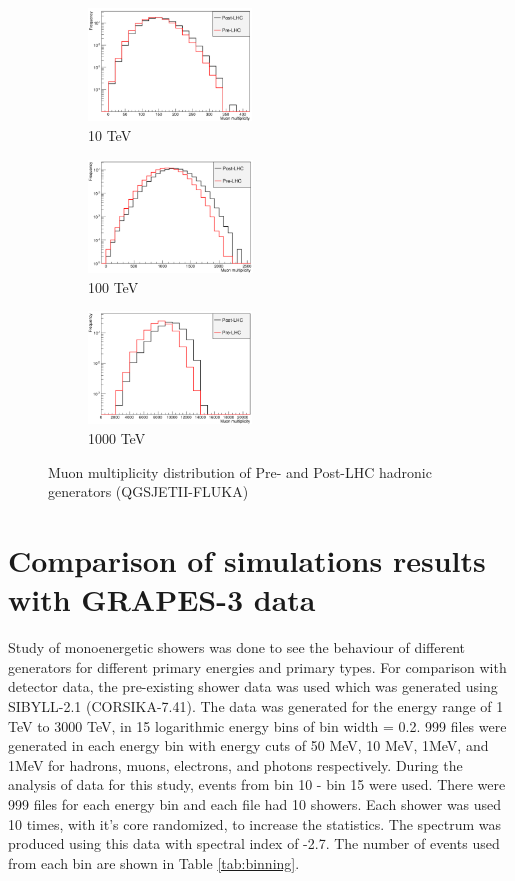 \documentclass[12pt]{article}
\begin{document}
\begin{figure}
\begin{subfigure}{0.32\textwidth}
\includegraphics[width=0.9\linewidth, height=3cm]{qgsii-lhc-mm10} 
\caption{10 TeV}
\label{fig:qgsii-lhc-mm10}
\end{subfigure}
\begin{subfigure}{0.32\textwidth}
\includegraphics[width=0.9\linewidth, height=3cm]{qgsii-lhc-mm100} 
\caption{100 TeV}
\label{fig:qgsii-lhc-mm100}
\end{subfigure}
\begin{subfigure}{0.32\textwidth}
\includegraphics[width=0.9\linewidth, height = 3cm]{qgsii-lhc-mm1000} 
\caption{1000 TeV}
\label{fig:qgsii-lhc-mm1000}
\end{subfigure}
\caption{Muon multiplicity distribution of Pre- and Post-LHC hadronic generators (QGSJETII-FLUKA)}
\label{fig:lhc_multiplicity_qgsii}
\end{figure}

\section{Comparison of simulations results with GRAPES-3 data}
Study of monoenergetic showers was done to see the behaviour of different generators for different primary energies and primary types. For comparison with detector data, the pre-existing shower data was used which was generated using SIBYLL-2.1 (CORSIKA-7.41). The data was generated for the energy range of 1 TeV to 3000 TeV, in 15 logarithmic energy bins of bin width = 0.2. 999 files were generated in each energy bin with energy cuts of 50 MeV, 10 MeV, 1MeV, and 1MeV for hadrons, muons, electrons, and photons respectively. During the analysis of data for this study, events from bin 10 - bin 15 were used. There were 999 files for each energy bin and each file had 10 showers. Each shower was used 10 times, with it's core randomized, to increase the statistics. The spectrum was produced using this data with spectral index of -2.7. The number of events used from each bin are shown in Table \ref{tab:binning}. 
\end{document}
